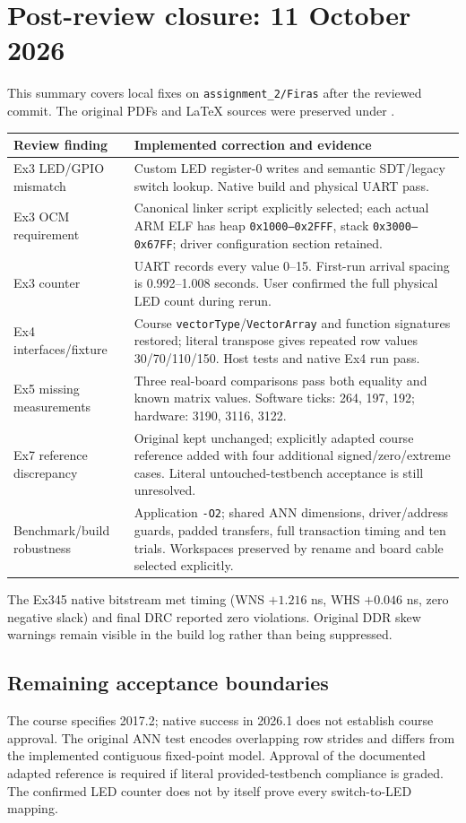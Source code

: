 \section*{Post-review closure: 11 October 2026}
This summary covers local fixes on \texttt{assignment\_2/Firas} after the
reviewed commit. The original PDFs and LaTeX sources were preserved under
.

\begin{tabularx}{\linewidth}{P{3.0cm} Y}
\toprule Review finding & Implemented correction and evidence \\
\midrule
Ex3 LED/GPIO mismatch & Custom LED register-0 writes and semantic SDT/legacy
switch lookup. Native build and physical UART pass. \\
Ex3 OCM requirement & Canonical linker script explicitly selected; each actual
ARM ELF has heap \texttt{0x1000--0x2FFF}, stack \texttt{0x3000--0x67FF};
driver configuration section retained. \\
Ex3 counter & UART records every value 0--15. First-run arrival spacing is
0.992--1.008 seconds. User confirmed the full physical LED count during rerun. \\
Ex4 interfaces/fixture & Course \texttt{vectorType}/\texttt{VectorArray} and
function signatures restored; literal transpose gives repeated row values
30/70/110/150. Host tests and native Ex4 run pass. \\
Ex5 missing measurements & Three real-board comparisons pass both equality and
known matrix values. Software ticks: 264, 197, 192; hardware: 3190, 3116, 3122. \\
Ex7 reference discrepancy & Original kept unchanged; explicitly adapted course
reference added with four additional signed/zero/extreme cases. Literal
untouched-testbench acceptance is still unresolved. \\
Benchmark/build robustness & Application \texttt{-O2}; shared ANN dimensions,
driver/address guards, padded transfers, full transaction timing and ten trials.
Workspaces preserved by rename and board cable selected explicitly. \\
\bottomrule
\end{tabularx}

The Ex345 native bitstream met timing (WNS $+1.216$ ns, WHS $+0.046$ ns,
zero negative slack) and final DRC reported zero violations. Original DDR
skew warnings remain visible in the build log rather than being suppressed.

\subsection*{Remaining acceptance boundaries}
The course specifies 2017.2; native success in 2026.1 does not establish course
approval. The original ANN test encodes overlapping row strides and differs
from the implemented contiguous fixed-point model. Approval of the documented
adapted reference is required if literal provided-testbench compliance is graded.
The confirmed LED counter does not by itself prove every switch-to-LED mapping.

